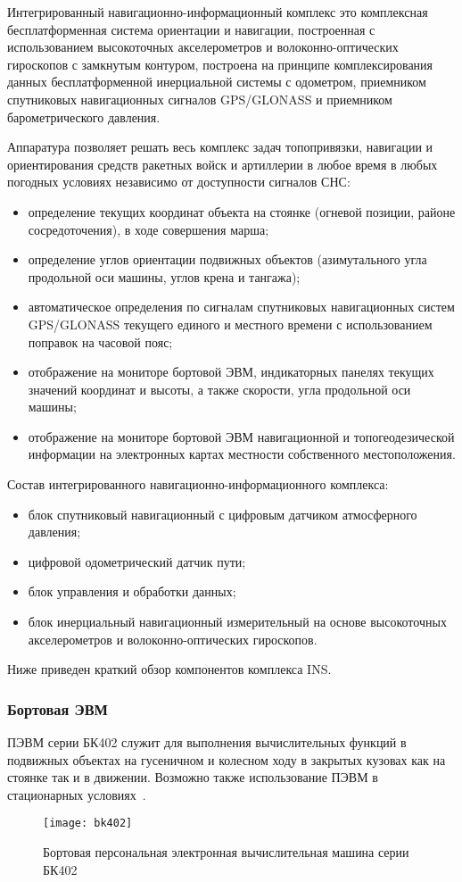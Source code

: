 Интегрированный навигационно-информационный комплекс это комплексная бесплатформенная система ориентации и навигации,
построенная с использованием высокоточных акселерометров и волоконно-оптических гироскопов с замкнутым контуром,
построена на принципе комплексирования данных бесплатформенной инерциальной системы с одометром, приемником спутниковых навигационных сигналов GPS/GLONASS и приемником барометрического давления.

Аппаратура позволяет  решать весь комплекс задач топопривязки, навигации и ориентирования средств ракетных войск и артиллерии в любое время в любых погодных условиях независимо от доступности сигналов СНС:
\begin{itemize}
	\item определение текущих координат объекта на стоянке (огневой позиции, районе сосредоточения), в ходе
		совершения марша;
	\item определение углов ориентации подвижных объектов (азимутального угла продольной оси машины, углов крена и
		тангажа);
	\item автоматическое определения по сигналам спутниковых навигационных систем GPS/GLONASS текущего
		единого и местного времени с использованием поправок на часовой пояс;
	\item отображение на мониторе бортовой ЭВМ, индикаторных панелях текущих значений координат и высоты, а также
		скорости, угла продольной оси машины;
	\item отображение на мониторе бортовой ЭВМ навигационной и топогеодезической информации на электронных картах
		местности собственного местоположения.
\end{itemize}

Состав интегрированного навигационно-информационного комплекса:
\begin{itemize}
	\item блок спутниковый навигационный с цифровым датчиком атмосферного давления;
	\item цифровой одометрический датчик пути;
	\item блок управления и обработки данных;
	\item блок инерциальный навигационный измерительный на основе высокоточных акселерометров и волоконно-оптических
		гироскопов.
\end{itemize}

Ниже приведен краткий обзор компонентов комплекса INS.

\subsubsection{Бортовая ЭВМ}
\label{sub:lit_review:ins:evm}
ПЭВМ серии БК402 служит для выполнения вычислительных функций в подвижных объектах на гусеничном и колесном ходу в закрытых кузовах
как на стоянке так и в движении. Возможно также использование ПЭВМ в стационарных условиях~\cite{bk402}.
\begin{figure}[ht]
	\centering
	\texttt{[image: bk402]}
	\caption{Бортовая персональная электронная вычислительная машина серии БК402~\cite{bk402}}
	\label{fig:lit_reiview:ins:evm:bk402}
\end{figure}

